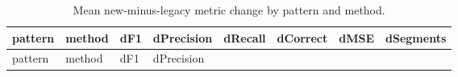 \documentclass[
  10pt,
]{article}
\begin{document}
\begin{longtable}[]{@{}
  >{\raggedright\arraybackslash}p{}
  >{\raggedright\arraybackslash}p{}
  >{\raggedleft\arraybackslash}p{}
  >{\raggedleft\arraybackslash}p{}
  >{\raggedleft\arraybackslash}p{}
  >{\raggedleft\arraybackslash}p{}
  >{\raggedleft\arraybackslash}p{}
  >{\raggedleft\arraybackslash}p{}@{}}
\caption{Mean new-minus-legacy metric change by pattern and
method.}\tabularnewline
\toprule\noalign{}
\begin{minipage}[b]{\linewidth}\raggedright
pattern
\end{minipage} & \begin{minipage}[b]{\linewidth}\raggedright
method
\end{minipage} & \begin{minipage}[b]{\linewidth}\raggedleft
dF1
\end{minipage} & \begin{minipage}[b]{\linewidth}\raggedleft
dPrecision
\end{minipage} & \begin{minipage}[b]{\linewidth}\raggedleft
dRecall
\end{minipage} & \begin{minipage}[b]{\linewidth}\raggedleft
dCorrect
\end{minipage} & \begin{minipage}[b]{\linewidth}\raggedleft
dMSE
\end{minipage} & \begin{minipage}[b]{\linewidth}\raggedleft
dSegments
\end{minipage} \\
\midrule\noalign{}
\endfirsthead
\toprule\noalign{}
\begin{minipage}[b]{\linewidth}\raggedright
pattern
\end{minipage} & \begin{minipage}[b]{\linewidth}\raggedright
method
\end{minipage} & \begin{minipage}[b]{\linewidth}\raggedleft
dF1
\end{minipage} & \begin{minipage}[b]{\linewidth}\raggedleft
dPrecision

\end{minipage}
\end{longtable}
\end{document}
